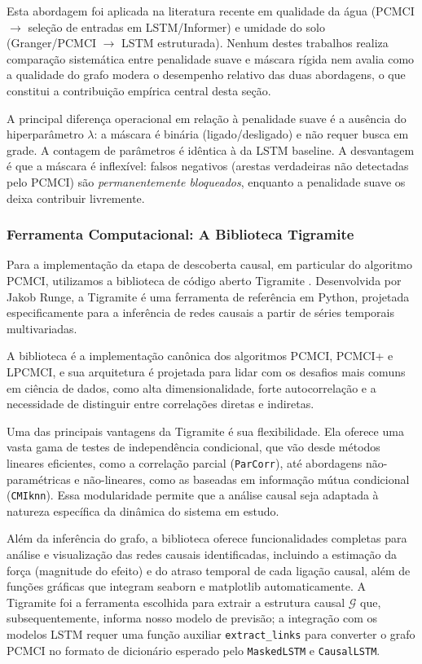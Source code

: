 \documentclass[12pt, a4paper]{article}
\begin{document}
Esta abordagem foi aplicada na literatura recente em qualidade da água \cite{zhang2024water} (PCMCI $\to$ seleção de entradas em LSTM/Informer) e umidade do solo \cite{li2022clstm} (Granger/PCMCI $\to$ LSTM estruturada). Nenhum destes trabalhos realiza comparação sistemática entre penalidade suave e máscara rígida nem avalia como a qualidade do grafo modera o desempenho relativo das duas abordagens, o que constitui a contribuição empírica central desta seção.

A principal diferença operacional em relação à penalidade suave é a ausência do hiperparâmetro $\lambda$: a máscara é binária (ligado/desligado) e não requer busca em grade. A contagem de parâmetros é idêntica à da LSTM baseline. A desvantagem é que a máscara é inflexível: falsos negativos (arestas verdadeiras não detectadas pelo PCMCI) são \emph{permanentemente bloqueados}, enquanto a penalidade suave os deixa contribuir livremente.

\subsubsection{Ferramenta Computacional: A Biblioteca Tigramite}


Para a implementação da etapa de descoberta causal, em particular do algoritmo PCMCI, utilizamos a biblioteca de código aberto Tigramite \cite{tigramite-docs}. Desenvolvida por Jakob Runge, a Tigramite é uma ferramenta de referência em Python, projetada especificamente para a inferência de redes causais a partir de séries temporais multivariadas.

A biblioteca é a implementação canônica dos algoritmos PCMCI, \mbox{PCMCI+} e LPCMCI, e sua arquitetura é projetada para lidar com os desafios mais comuns em ciência de dados, como alta dimensionalidade, forte autocorrelação e a necessidade de distinguir entre correlações diretas e indiretas.

Uma das principais vantagens da Tigramite é sua flexibilidade. Ela oferece uma vasta gama de testes de independência condicional, que vão desde métodos lineares eficientes, como a correlação parcial (\texttt{ParCorr}), até abordagens não-paramétricas e não-lineares, como as baseadas em informação mútua condicional (\texttt{CMIknn}). Essa modularidade permite que a análise causal seja adaptada à natureza específica da dinâmica do sistema em estudo.

Além da inferência do grafo, a biblioteca oferece funcionalidades completas para análise e visualização das redes causais identificadas, incluindo a estimação da força (magnitude do efeito) e do atraso temporal de cada ligação causal, além de funções gráficas que integram seaborn e matplotlib automaticamente. A Tigramite foi a ferramenta escolhida para extrair a estrutura causal $\mathcal{G}$ que, subsequentemente, informa nosso modelo de previsão; a integração com os modelos LSTM requer uma função auxiliar \texttt{extract\_links} para converter o grafo PCMCI no formato de dicionário esperado pelo \texttt{MaskedLSTM} e \texttt{CausalLSTM}.
\end{document}
